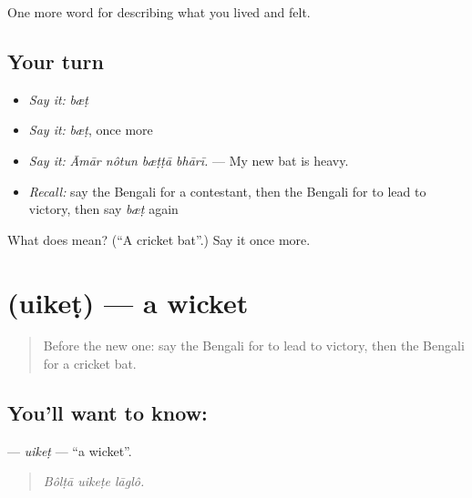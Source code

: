 \begin{grammarlens}[title={What you've built}]
One more word for describing what you lived and felt.
\end{grammarlens}

\subsection*{Your turn}
\begin{itemize}
\raggedright
  \item \emph{Say it:} \emph{bæṭ}
  \item \emph{Say it:} \emph{bæṭ}, once more
  \item \emph{Say it:} \emph{Āmār nôtun bæṭṭā bhārī.} — My new bat is heavy.
  \item \emph{Recall:} say the Bengali for a contestant, then the Bengali for to lead to victory, then say \emph{bæṭ} again
\end{itemize}

\begin{tcolorbox}[breakable,colback=teal!4,colframe=teal!35!black,title={Before you move on}]
What does  mean? (\textquotedblleft{}A cricket bat\textquotedblright{}.) Say it once more.
\end{tcolorbox}
\section[\texorpdfstring{\bn{উইকেট} (uikeṭ)}{উইকেট (uikeṭ)}]{ (uikeṭ) — a wicket}

\label{lesson:BN-C521-uiket}



\begin{quote}
Before the new one: say the Bengali for to lead to victory, then the Bengali for a cricket bat.
\end{quote}

\subsection*{You'll want to know: }
\textbf{} — \emph{uikeṭ} — \textquotedblleft{}a wicket\textquotedblright{}.

\begin{quote}
  
\end{quote}

\begin{quote}
\emph{Bôlṭā uikeṭe lāglô.}
\end{quote}

